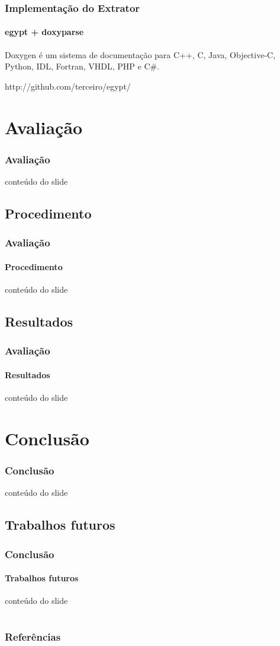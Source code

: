 \documentclass{beamer}
\begin{document}
\begin{frame}
\frametitle{Implementação do Extrator}
\framesubtitle{egypt + doxyparse}
 Doxygen é um sistema de documentação para C++, C, Java, Objective-C, Python,
 IDL, Fortran, VHDL, PHP e C\#.

http://github.com/terceiro/egypt/
\end{frame}

\section{Avaliação}

\begin{frame}
\frametitle{Avaliação}
 conteúdo do slide
\end{frame}

\subsection{Procedimento}

\begin{frame}
\frametitle{Avaliação}
\framesubtitle{Procedimento}
 conteúdo do slide
\end{frame}

\subsection{Resultados}

\begin{frame}
\frametitle{Avaliação}
\framesubtitle{Resultados}
 conteúdo do slide
\end{frame}

\section{Conclusão}

\begin{frame}
\frametitle{Conclusão}
 conteúdo do slide
\end{frame}

\subsection{Trabalhos futuros}

\begin{frame}
\frametitle{Conclusão}
\framesubtitle{Trabalhos futuros}
 conteúdo do slide\cite{measuringCouplingAndCohesion}
\end{frame}

\section{}

\begin{frame}
\frametitle{Referências}

{}
\end{frame}
\end{document}
